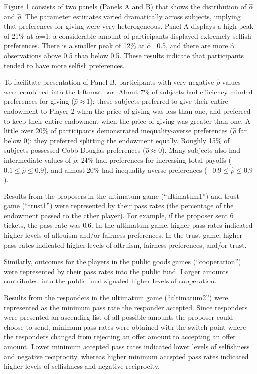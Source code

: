 \documentclass[12pt]{article}
\begin{document}
Figure 1 consists of two panels (Panels A and B) that shows the distribution of  \(\hat{\alpha}\) and \(\hat{\rho}\). The parameter estimates varied dramatically across subjects, implying that preferences for giving were very heterogeneous. Panel A displays a high peak of 21\% at \(\hat{\alpha}\)=1: a considerable amount of participants displayed extremely selfish preferences. There is a smaller peak of 12\% at \(\hat{\alpha}\)=0.5, and there are more \(\hat{\alpha}\) observations above 0.5 than below 0.5. These results indicate that participants tended to have more selfish preferences. 

To facilitate presentation of Panel B, participants with very negative \(\hat{\rho}\) values were combined into the leftmost bar. About 7\% of subjects had efficiency-minded preferences for giving (\(\hat{\rho} \approx 1\)): these subjects preferred to give their entire endowment to Player 2 when the price of giving was less than one, and preferred to keep their entire endowment when the price of giving was greater than one. A little over 20\% of participants demonstrated inequality-averse preferences (\(\hat{\rho}\) far below 0): they preferred splitting the endowment equally. Roughly 15\% of subjects possessed Cobb-Douglas preferences (\(\hat{\rho} \approx 0\)). Many subjects also had intermediate values of \(\hat{\rho}\): 24\% had preferences for increasing total payoffs (\(0.1 \leq \hat{\rho} \leq 0.9\)), and almost 20\% had inequality-averse preferences (\(-0.9 \leq \hat{\rho} \leq 0.9\)).

Results from the proposers in the ultimatum game (``ultimatum1'') and trust game (``trust1'') were represented by their pass rates (the percentage of the endowment passed to the other player). For example, if the proposer sent 6 tickets, the pass rate was 0.6. In the ultimatum game, higher pass rates indicated higher levels of altruism and/or fairness preferences. In the trust game, higher pass rates indicated higher levels of altruism, fairness preferences, and/or trust. 

Similarly, outcomes for the players in the public goods games (``cooperation'') were represented by their pass rates into the public fund. Larger amounts contributed into the public fund signaled higher levels of cooperation.

Results from the responders in the ultimatum game (``ultimatum2'') were represented as the minimum pass rate the responder accepted. Since responders were presented an ascending list of all possible amounts the proposer could choose to send, minimum pass rates were obtained with the switch point where the responders changed from rejecting an offer amount to accepting an offer amount. Lower minimum accepted pass rates indicated lower levels of selfishness and negative reciprocity, whereas higher minimum accepted pass rates indicated higher levels of selfishness and negative reciprocity.
\end{document}
